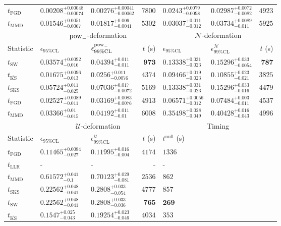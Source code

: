 \begin{tabular}{l|llr|llr}
	$t_{\mathrm{FGD}}$ & ${\mathbf{0.00208_{-0.00074}^{+0.00048}}}$ & ${\mathbf{0.00276_{-0.00062}^{+0.00041}}}$ & $7800$ & $0.0243_{-0.0098}^{+0.0079}$ & $0.02987_{-0.0082}^{+0.0072}$ & $4923$ \\
	$t_{\mathrm{MMD}}$ & $0.01546_{-0.0067}^{+0.0051}$ & $0.01817_{-0.0041}^{+0.006}$ & $5302$ & $0.03037_{-0.012}^{+0.011}$ & $0.03734_{-0.011}^{+0.0089}$ & $5925$ \\
	\toprule
	\multicolumn{1}{c}{} & \multicolumn{3}{c}{$\rm{pow}_{-}$-deformation} & \multicolumn{3}{c}{$\mathcal{N}$-deformation} \\
	Statistic & $\epsilon_{95\%\mathrm{CL}}$ & $\epsilon^  {\rm{pow}_{-}}_{99\%\mathrm{CL}}$ & $t$ (s) & $\epsilon_{95\%\mathrm{CL}}$ & $\epsilon^    {\mathcal{N}}_{99\%\mathrm{CL}}$ & $t$ (s) \\
	\midrule
	$t_{\mathrm{SW}}$ & $0.03574_{-0.016}^{+0.0092}$ & $0.04394_{-0.011}^{+0.011}$ & ${\mathbf{973}}$ & $0.13338_{-0.023}^{+0.031}$ & $0.15296_{-0.0054}^{+0.033}$ & ${\mathbf{787}}$ \\
	$t_{\overline{\mathrm{KS}}}$ & ${\mathbf{0.01675_{-0.013}^{+0.0096}}}$ & ${\mathbf{0.0256_{-0.0076}^{+0.011}}}$ & $4374$ & $0.09466_{-0.023}^{+0.019}$ & $0.10855_{-0.021}^{+0.023}$ & $3825$ \\
	$t_{\mathrm{SKS}}$ & $0.05724_{-0.025}^{+0.011}$ & $0.07036_{-0.0072}^{+0.017}$ & $5169$ & $0.13338_{-0.023}^{+0.031}$ & $0.15296_{-0.016}^{+0.033}$ & $4479$ \\
	$t_{\mathrm{FGD}}$ & $0.02527_{-0.011}^{+0.0089}$ & $0.03169_{-0.0076}^{+0.0083}$ & $4913$ & ${\mathbf{0.06571_{-0.012}^{+0.0056}}}$ & ${\mathbf{0.07484_{-0.011}^{+0.003}}}$ & $4537$ \\
	$t_{\mathrm{MMD}}$ & $0.03366_{-0.015}^{+0.01}$ & $0.04192_{-0.01}^{+0.011}$ & $6008$ & $0.35498_{-0.049}^{+0.028}$ & $0.40428_{-0.043}^{+0.016}$ & $4996$ \\
	\toprule
	\multicolumn{1}{c}{} & \multicolumn{3}{c}{$\mathcal{U}$-deformation} & \multicolumn{3}{c}{Timing} \\
	Statistic & $\epsilon_{95\%\mathrm{CL}}$ & $\epsilon^    {\mathcal{U}}_{99\%\mathrm{CL}}$ & $t$ (s) & $t^{\mathrm{null}}$ (s) \\
	\midrule
	$t_{\mathrm{FGD}}$ & ${\mathbf{0.11465_{-0.027}^{+0.0084}}}$ & ${\mathbf{0.11995_{-0.004}^{+0.016}}}$ & $4174$ & $1336$ \\
	$t_{\mathrm{LLR}}$ & - & - & - & - \\
	$t_{\mathrm{MMD}}$ & $0.61572_{-0.1}^{+0.041}$ & $0.70123_{-0.081}^{+0.029}$ & $2536$ & $862$ \\
	$t_{\mathrm{SKS}}$ & $0.22562_{-0.041}^{+0.048}$ & $0.2808_{-0.054}^{+0.033}$ & $4777$ & $857$ \\
	$t_{\mathrm{SW}}$ & $0.22562_{-0.041}^{+0.048}$ & $0.2808_{-0.036}^{+0.033}$ & ${\mathbf{765}}$ & ${\mathbf{269}}$ \\
	$t_{\overline{\mathrm{KS}}}$ & $0.1547_{-0.043}^{+0.025}$ & $0.19254_{-0.046}^{+0.023}$ & $4034$ & $353$ \\
	\bottomrule
\end{tabular}